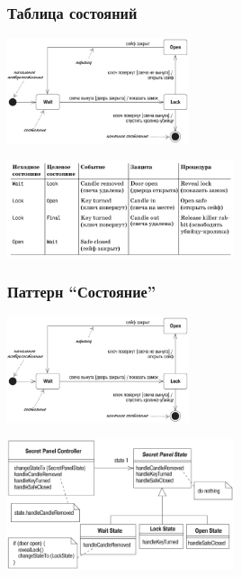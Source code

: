 \documentclass{../mcsslides}
\begin{document}
    \begin{frame}
        \frametitle{Таблица состояний}
        \begin{center}
            \includegraphics[width=0.4\textwidth]{stateTransitionSyntax.png}
        \end{center}

        \begin{center}
            \includegraphics[width=0.5\textwidth]{stateTransitionStateTable.png}
        \end{center}
    \end{frame}

    \begin{frame}
        \frametitle{Паттерн ``Состояние''}
        \begin{center}
            \includegraphics[width=0.4\textwidth]{stateTransitionSyntax.png}
        \end{center}

        \begin{center}
            \includegraphics[width=0.5\textwidth]{stateTransitionStatePattern.png}
        \end{center}
    \end{frame}
\end{document}
